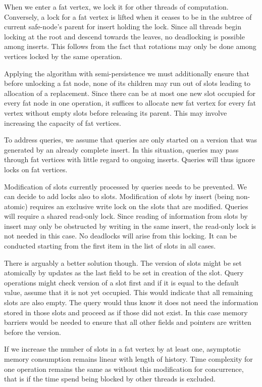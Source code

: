 When we enter a fat vertex, we lock it for other threads of computation. Conversely, a lock for a fat vertex is lifted when it ceases to be in the subtree of current safe-node's parent for insert holding the lock. Since all threads begin locking at the root and descend towards the leaves, no deadlocking is possible among inserts. This follows from the fact that rotations may only be done among vertices locked by the same operation.

Applying the algorithm with semi-persistence we must additionally ensure that before unlocking a fat node, none of its children may run out of slots leading to allocation of a replacement. Since there can be at most one new slot occupied for every fat node in one operation, it suffices to allocate new fat vertex for every fat vertex without empty slots before releasing its parent. This may involve increasing the capacity of fat vertices.

To address queries, we assume that queries are only started on a version that was generated by an already complete insert. In this situation, queries may pass through fat vertices with little regard to ongoing inserts. Queries will thus ignore locks on fat vertices. 

Modification of slots currently processed by queries needs to be prevented. We can decide to add locks also to slots. Modification of slots by insert (being non-atomic) requires an exclusive write lock on the slots that are modified. Queries will require a shared read-only lock. Since reading of information from slots by insert may only be obstructed by writing in the same insert, the read-only lock is not needed in this case. No deadlocks will arise from this locking. It can be conducted starting from the first item in the list of slots in all cases. 

There is arguably a better solution though. The version of slots might be set atomically by updates as the last field to be set in creation of the slot. Query operations might check version of a slot first and if it is equal to the default value, assume that it is not yet occupied. This would indicate that all remaining slots are also empty. The query would thus know it does not need the information stored in those slots and proceed as if those did not exist. 
In this case memory barriers would be needed to ensure that all other fields and pointers are written before the version.

If we increase the number of slots in a fat vertex by at least one, asymptotic memory consumption remains linear with length of history. Time complexity for one operation remains the same as without this modification for concurrence, that is if the time spend being blocked by other threads is excluded.

